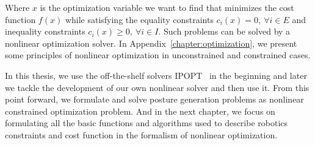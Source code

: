 Where $x$ is the optimization variable we want to find that minimizes the cost function $f(x)$ while satisfying the equality constraints $c_i(x) = 0,\ \forall i\in{E}$ and inequality constraints $c_i(x) \geq 0,\ \forall i\in{I}$.
Such problems can be solved by a nonlinear optimization solver.
In Appendix~\ref{chapter:optimization}, we present some principles of nonlinear optimization in unconstrained and constrained cases.

In this thesis, we use the off-the-shelf solvers IPOPT~\cite{wachter:mathprog:2006} in the beginning and later we tackle the development of our own nonlinear solver and then use it.
From this point forward, we formulate and solve posture generation problems as nonlinear constrained optimization problem.
And in the next chapter, we focus on formulating all the basic functions and algorithms used to describe robotics constraints and cost function in the formalism of nonlinear optimization.
